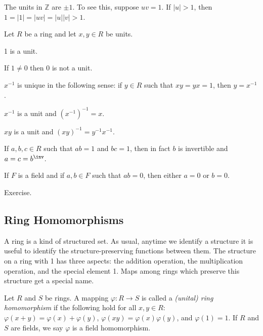 \begin{exm*}
The units in $\mathbb{Z}$ are $\pm 1$. To see this, suppose $uv = 1$. If $|u| > 1$, then $1 = |1| = |uv| = |u||v| >  1$.
\end{exm*}

\begin{prp} Let $R$ be a ring and let $x,y \in R$ be units.
\label{prp:ring:unit}
\begin{enumerate*}
\item 1 is a unit.
\item If $1 \neq 0$ then $0$ is not a unit.
\item{\label{prp:ring:unit:inv-uniq}} $x^{-1}$ is unique in the following sense: if $y \in R$ such that $xy=yx=1$, then $y = x^{-1}$.
\item $x^{-1}$ is a unit and $(x^{-1})^{-1} = x$.
\item $xy$ is a unit and $(xy)^{-1} = y^{-1}x^{-1}$.
\item If $a,b,c \in R$ such that $ab = 1$ and $bc = 1$, then in fact $b$ is invertible and $a = c = b^\inv$.
\item If $F$ is a field and if $a,b \in F$ such that $ab = 0$, then either $a = 0$ or $b = 0$.
\end{enumerate*}
\end{prp}

\begin{theproof}
Exercise.
\end{theproof}

\subsection*{Ring Homomorphisms}

A ring is a kind of structured set. As usual, anytime we identify a structure it is useful to identify the structure-preserving functions between them. The structure on a ring with 1 has three aspects: the addition operation, the multiplication operation, and the special element 1. Maps among rings which preserve this structure get a special name.

\begin{dfn}
Let $R$ and $S$ be rings. A mapping $\varphi : R \rightarrow S$ is called a \emph{(unital) ring homomorphism} if the following hold for all $x,y \in R$: $\varphi(x+y) = \varphi(x)+\varphi(y)$, $\varphi(xy) = \varphi(x)\varphi(y)$, and $\varphi(1) = 1$. If $R$ and $S$ are fields, we say $\varphi$ is a field homomorphism.
\end{dfn}


